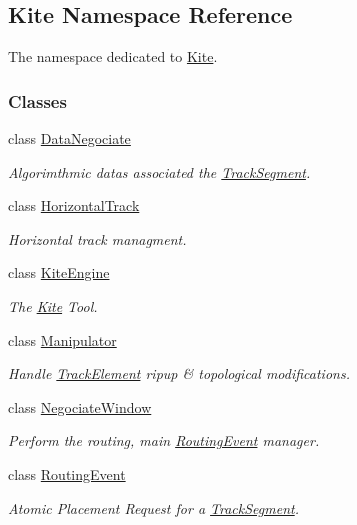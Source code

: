 \hypertarget{namespaceKite}{}\subsection{Kite Namespace Reference}
\label{namespaceKite}


The namespace dedicated to \hyperlink{namespaceKite}{Kite}.  


\subsubsection*{Classes}
\begin{DoxyCompactItemize}
\item 
class \hyperlink{classKite_1_1DataNegociate}{Data\+Negociate}
\begin{DoxyCompactList}\small\item\em Algorimthmic datas associated the \hyperlink{classKite_1_1TrackSegment}{Track\+Segment}. \end{DoxyCompactList}\item 
class \hyperlink{classKite_1_1HorizontalTrack}{Horizontal\+Track}
\begin{DoxyCompactList}\small\item\em Horizontal track managment. \end{DoxyCompactList}\item 
class \hyperlink{classKite_1_1KiteEngine}{Kite\+Engine}
\begin{DoxyCompactList}\small\item\em The \hyperlink{namespaceKite}{Kite} Tool. \end{DoxyCompactList}\item 
class \hyperlink{classKite_1_1Manipulator}{Manipulator}
\begin{DoxyCompactList}\small\item\em Handle \hyperlink{classKite_1_1TrackElement}{Track\+Element} ripup \& topological modifications. \end{DoxyCompactList}\item 
class \hyperlink{classKite_1_1NegociateWindow}{Negociate\+Window}
\begin{DoxyCompactList}\small\item\em Perform the routing, main \hyperlink{classKite_1_1RoutingEvent}{Routing\+Event} manager. \end{DoxyCompactList}\item 
class \hyperlink{classKite_1_1RoutingEvent}{Routing\+Event}
\begin{DoxyCompactList}\small\item\em Atomic Placement Request for a \hyperlink{classKite_1_1TrackSegment}{Track\+Segment}. \end{DoxyCompactList}\item 

\end{DoxyCompactItemize}
